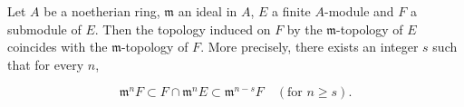 Let $A$ be a noetherian ring, $\mathfrak{m}$ an ideal in $A$, $E$ a finite $A$-module and $F$ a submodule of $E$. Then the topology induced on $F$ by the $\mathfrak{m}$-topology of $E$ coincides with the $\mathfrak{m}$-topology of $F$. More precisely, there exists an integer $s$ such that for every $n$,

$$\mathfrak{m}^n F \subset F \cap \mathfrak{m}^n E \subset \mathfrak{m}^{n-s} F \quad (\text{for } n \geq s).$$